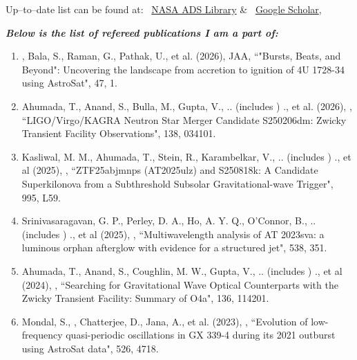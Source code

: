 \small
Up--to--date list can be found at: 
\faGlobe~\href{https://ui.adsabs.harvard.edu/search/q=orcid%3A0000-0003-3173-4691&sort=date+desc}{NASA ADS Library} \& \faIcon{google}~\href{https://scholar.google.com/citations?user=BdMzZJ4AAAAJ}{Google Scholar}, 
\\
\vspace{0.5em}
\normalsize

\textit{\textbf{Below is the list of refereed publications I am a part of:}}
\begin{enumerate}[leftmargin=*]

\item \me, Bala, S., Raman, G., Pathak, U., et al. (2026), JAA, {``"Bursts, Beats, and Beyond": Uncovering the landscape from accretion to ignition of 4U 1728-34 using AstroSat"}, 47, 1.

\vspace{0.5em}
\item Ahumada, T., Anand, S., Bulla, M., Gupta, V., .. (includes \me) ., et al. (2026), \pasp, {``LIGO/Virgo/KAGRA Neutron Star Merger Candidate S250206dm: Zwicky Transient Facility Observations"}, 138, 034101.

\item Kasliwal, M. M., Ahumada, T., Stein, R., Karambelkar, V., .. (includes \me) ., et al (2025), \apjl, {``ZTF25abjmnps (AT2025ulz) and S250818k: A Candidate Superkilonova from a Subthreshold Subsolar Gravitational-wave Trigger"}, 995, L59.

\item Srinivasaragavan, G. P., Perley, D. A., Ho, A. Y. Q., O'Connor, B., .. (includes \me) ., et al (2025), \mnras, {``Multiwavelength analysis of AT 2023sva: a luminous orphan afterglow with evidence for a structured jet"}, 538, 351.

\item Ahumada, T., Anand, S., Coughlin, M. W., Gupta, V., .. (includes \me) ., et al (2024), \pasp, {``Searching for Gravitational Wave Optical Counterparts with the Zwicky Transient Facility: Summary of O4a"}, 136, 114201.

\item Mondal, S., \me, Chatterjee, D., Jana, A., et al. (2023), \mnras, {``Evolution of low-frequency quasi-periodic oscillations in GX 339-4 during its 2021 outburst using AstroSat data"}, 526, 4718.

\end{enumerate}
